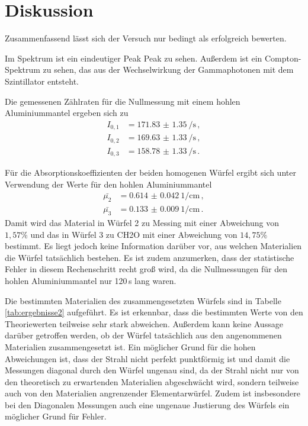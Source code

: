 \section{Diskussion}
\label{sec:Diskussion}

Zusammenfassend lässt sich der Versuch nur bedingt als erfolgreich bewerten.

Im Spektrum ist ein eindeutiger Peak Peak zu sehen. Außerdem ist ein Compton-Spektrum
zu sehen, das aus der Wechselwirkung der Gammaphotonen mit dem Szintillator entsteht.

Die gemessenen Zählraten für die Nullmessung mit einem hohlen Aluminiummantel
ergeben sich zu
\begin{align*}
  I_{0,1}&=\SI{171.83(135)}{\per\second} \,, \\
  I_{0,2}&=\SI{169.63(133)}{\per\second} \,, \\
  I_{0,3}&=\SI{158.78(133)}{\per\second} \,.
\end{align*}

Für die Absorptionskoeffizienten der beiden homogenen Würfel ergibt sich unter Verwendung der
Werte für den hohlen Aluminiummantel
\begin{align*}
  \bar{\mu_2}&= \SI{0.614(42)}{1\per \centi\metre}\,, \\
  \bar{\mu_3}&=\SI{0.133(9)}{1\per \centi\metre} \,.
\end{align*}
Damit wird das Material in Würfel 2 zu Messing mit einer Abweichung von $1{,}57\%$
und das in Würfel 3 zu CH2O mit einer Abweichung von $14{,}75\%$ bestimmt. Es liegt
jedoch keine Information darüber vor, aus welchen Materialien die Würfel tatsächlich bestehen.
Es ist zudem anzumerken, dass der statistische Fehler in diesem Rechenschritt recht groß
wird, da die Nullmessungen für den hohlen Aluminiummantel nur 120\,s lang waren.

Die bestimmten Materialien des zusammengesetzten Würfels sind in Tabelle \ref{tab:ergebnisse2}
aufgeführt. Es ist erkennbar, dass die bestimmten Werte von den Theoriewerten teilweise sehr stark abweichen. Außerdem kann keine Aussage darüber getroffen werden, ob der Würfel tatsächlich aus den angenommenen Materialien zusammengesetzt ist. Ein möglicher Grund für die hohen Abweichungen ist, dass der
Strahl nicht perfekt punktförmig ist und damit die Messungen diagonal durch den Würfel ungenau sind, da der Strahl nicht nur von den theoretisch zu erwartenden Materialien abgeschwächt wird, sondern teilweise auch von den Materialien angrenzender Elementarwürfel. Zudem ist insbesondere bei den Diagonalen Messungen auch eine ungenaue Justierung des Würfels ein möglicher Grund für Fehler.
